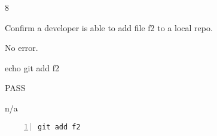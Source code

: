 \begin{description}[align=right,leftmargin=3.2cm,labelindent=3.0cm]
\item[Step:] 8
\item[Confirm:] Confirm a developer is able to add file f2 to a local repo.
\item[Expectation:] No error.
\item[Command:] echo git  add f2
\item[Test Result:] PASS
\item[Evidence:] n/a
\end{description}
\begin{lstlisting}[numbers=left]
git add f2

\end{lstlisting}
